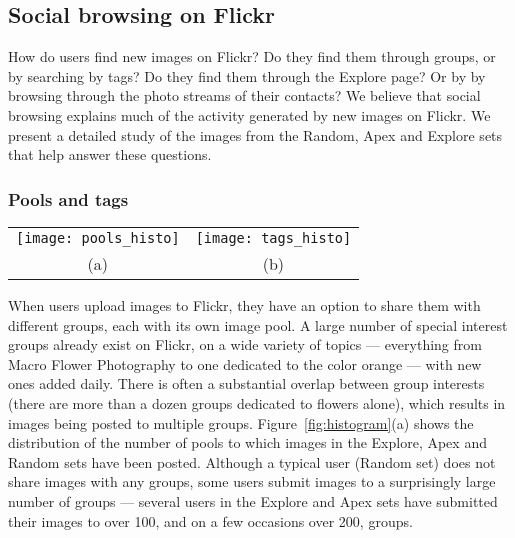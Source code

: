 \documentclass[]{article}
\newcommand{\source}[1]{\textsf{#1}}
\newcommand{\figref}[1]{Figure~\ref{#1}}
\begin{document}
\subsection{Social browsing on Flickr}
\label{sec:socialbrowsingflickr}
How do users find new images on Flickr? Do they
find them through groups, or by searching by tags? Do they find them
through the Explore page? Or by
by browsing through the photo streams of their contacts? We believe
that social browsing explains much of the activity generated by new images on Flickr.
We present a detailed study of the images from the
\source{Random}, \source{Apex} and \source{Explore} sets that help
answer these questions.

\subsubsection{Pools and tags}
\label{sec:pools}

\begin{figure*}[tbhp]
\center
 \begin{tabular}{cc}
\texttt{[image: pools\_histo]} &

  \texttt{[image: tags\_histo]} \\
  (a) & (b)

\end{tabular}
  \caption{Histogram of (a) the number of pools to which images from each set were submitted and
  (b) the number of tags assigned to the images}\label{fig:histogram}
\end{figure*}

When users upload images to Flickr, they have an option to share
them with different groups, each with its own image pool. A large
number of special interest groups already exist on Flickr, on a wide
variety of topics --- everything from Macro Flower Photography to
one dedicated to the color orange --- with new ones added daily.
There is often a substantial overlap between group interests (there
are more than a dozen groups dedicated to flowers alone), which
results in images being posted to multiple groups.
\figref{fig:histogram}(a) shows the distribution of the number of
pools to which images in the \source{Explore}, \source{Apex} and
\source{Random} sets have been posted. Although a typical user
(\source{Random} set) does not share images with any groups, some
users submit images to a surprisingly large number of groups ---
several users in the \source{Explore} and \source{Apex} sets have
submitted their images to over 100, and on a few occasions over 200,
groups.
\end{document}
